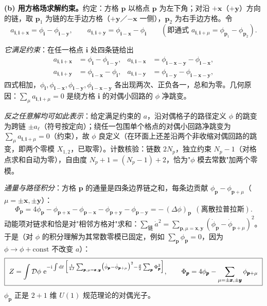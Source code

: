 \textbf{(b) 用方格场求解约束。}约定：方格 $\pmb p$ 以格点 $\pmb p$ 为左下角；对沿 $+\pmb x$（$+\pmb y$）方向的链，取 $\pmb p_1$ 为链的左手边方格（$+\pmb y$／$-\pmb x$ 一侧），$\pmb p_2$ 为右手边方格。令
\begin{equation*}
a_{\pmb i,\pmb i+\pmb x}=\phi_{\pmb i}-\phi_{\pmb i-\pmb y},
\qquad
a_{\pmb i,\pmb i+\pmb y}=\phi_{\pmb i-\pmb x}-\phi_{\pmb i}
\qquad(\text{即通式 }a_{\pmb i,\pmb i+\mu}=\phi_{\pmb p_1}-\phi_{\pmb p_2}) .
\end{equation*}

\emph{它满足约束}：在任一格点 $\pmb i$ 处四条链给出
\begin{align*}
a_{\pmb i,\pmb i+\pmb x}&=\phi_{\pmb i}-\phi_{\pmb i-\pmb y},&
a_{\pmb i,\pmb i-\pmb x}&=\phi_{\pmb i-\pmb x-\pmb y}-\phi_{\pmb i-\pmb x},\\
a_{\pmb i,\pmb i+\pmb y}&=\phi_{\pmb i-\pmb x}-\phi_{\pmb i},&
a_{\pmb i,\pmb i-\pmb y}&=\phi_{\pmb i-\pmb y}-\phi_{\pmb i-\pmb x-\pmb y},
\end{align*}
四式相加，$\phi_{\pmb i},\phi_{\pmb i-\pmb x},\phi_{\pmb i-\pmb y},\phi_{\pmb i-\pmb x-\pmb y}$ 各出现两次、正负各一，总和为零。几何原因：$\sum_\mu a_{\pmb i,\pmb i+\mu}=0$ 是绕方格 $\pmb i$ 的对偶小回路的 $\phi$ 净跳变。

\emph{反之任意解均可如此表示}：给定满足约束的 $a$，沿对偶格子的路径定义 $\phi$ 的跳变为跨链 $\pm a_\ell$（符号按定向）；绕任一包围单个格点的对偶小回路净跳变为 $\sum_\mu a_{\pmb i,\pmb i+\mu}=0$（约束），故 $\phi$ 良定义（在环面上还差沿两个非收缩对偶回路的跳变，即两个零模 $X_{1,2}$，已取零）。计数核验：链数 $2N_p$，独立约束 $N_p-1$（对格点求和自动为零），自由度 $N_p+1=(N_p-1)+2$，恰为"$\phi$ 模去常数"加两个零模。

\emph{通量与路径积分}：方格 $\pmb p$ 的通量是四条边界链之和，每条边贡献 $\phi_{\pmb p}-\phi_{\pmb p+\mu}$（$\mu=\pm\pmb x,\pm\pmb y$）：
\begin{equation*}
\Phi_{\pmb p}=4\phi_{\pmb p}-\phi_{\pmb p+\pmb x}-\phi_{\pmb p-\pmb x}-\phi_{\pmb p+\pmb y}-\phi_{\pmb p-\pmb y}
=-\,(\Delta\phi)_{\pmb p}\ \ (\text{离散拉普拉斯}) .
\end{equation*}
动能项对链求和恰是对"相邻方格对"求和：$\sum_{\text{链}}\dot a^{2}=\sum_{\pmb p,\mu=\pmb x,\pmb y}(\dot\phi_{\pmb p}-\dot\phi_{\pmb p+\mu})^{2}$。于是（对 $\phi$ 的积分理解为其常数零模已固定，例如 $\sum_{\pmb p}\phi_{\pmb p}=0$，因为 $\phi\to\phi+\text{const}$ 不改变 $a$）：
\begin{equation*}
\boxed{\ Z=\int\mathcal{D}\phi\ \mathrm{e}^{-\mathrm{i}\int\mathrm{d}t\,\Bigl[\frac{1}{4J}\sum_{\pmb p,\mu=\pmb x,\pmb y}\bigl(\dot\phi_{\pmb p}-\dot\phi_{\pmb p+\mu}\bigr)^{2}-\frac{g}{2}\sum_{\pmb p}\Phi_{\pmb p}^{2}\Bigr]},
\qquad
\Phi_{\pmb p}=4\phi_{\pmb p}-\sum_{\mu=\pm\pmb x,\pm\pmb y}\phi_{\pmb p+\mu}\ }
\end{equation*}
$\phi_{\pmb p}$ 正是 $2+1$ 维 $U(1)$ 规范理论的对偶光子。

